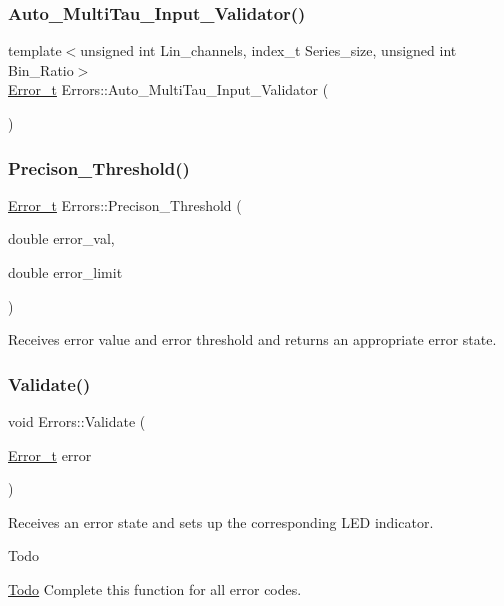 \subsubsection{\texorpdfstring{Auto\+\_\+\+Multi\+Tau\+\_\+\+Input\+\_\+\+Validator()}{Auto\_MultiTau\_Input\_Validator()}}
{\footnotesize\ttfamily template$<$unsigned int Lin\+\_\+channels, index\+\_\+t Series\+\_\+size, unsigned int Bin\+\_\+\+Ratio$>$ \\
\hyperlink{errors_8hpp_a4e8c0d09726859e3d3369c0da5a1aa7f}{Error\+\_\+t} Errors\+::\+Auto\+\_\+\+Multi\+Tau\+\_\+\+Input\+\_\+\+Validator (\begin{DoxyParamCaption}{ }\end{DoxyParamCaption})}

\mbox{\label{namespaceErrors_a13171d3d324164c9f7a9508d5a16b0c5}} 
\subsubsection{\texorpdfstring{Precison\+\_\+\+Threshold()}{Precison\_Threshold()}}
{\footnotesize\ttfamily \hyperlink{errors_8hpp_a4e8c0d09726859e3d3369c0da5a1aa7f}{Error\+\_\+t} Errors\+::\+Precison\+\_\+\+Threshold (\begin{DoxyParamCaption}\item[{double}]{error\+\_\+val,  }\item[{double}]{error\+\_\+limit }\end{DoxyParamCaption})}



Receives error value and error threshold and returns an appropriate error state. 

\mbox{\label{namespaceErrors_a51461dff689e5f46ea124f1e13806c01}} 
\subsubsection{\texorpdfstring{Validate()}{Validate()}}
{\footnotesize\ttfamily void Errors\+::\+Validate (\begin{DoxyParamCaption}\item[{\hyperlink{errors_8hpp_a4e8c0d09726859e3d3369c0da5a1aa7f}{Error\+\_\+t}}]{error }\end{DoxyParamCaption})}



Receives an error state and sets up the corresponding L\+ED indicator. 

\begin{DoxyRefDesc}{Todo}
\item[\hyperlink{todo__todo000001}{Todo}]Complete this function for all error codes. \end{DoxyRefDesc}
